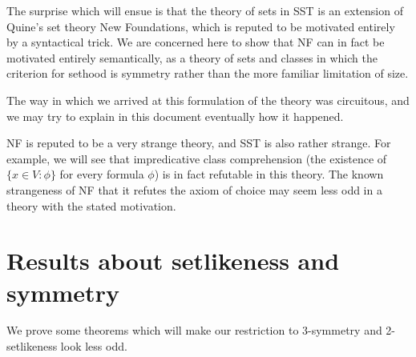 \documentclass[12pt]{article}
\begin{document}
The surprise which will ensue is that the theory of sets in SST is an extension of Quine's set theory New Foundations, which is reputed to be motivated entirely by a syntactical trick.  We are concerned here to show that NF can in fact be motivated entirely semantically, as a theory of sets and classes in which the criterion for sethood is symmetry rather than the more familiar limitation of size.

The way in which we arrived at this formulation of the theory was circuitous, and we may try to explain in this document eventually how it happened.

NF is reputed to be a very strange theory, and SST is also rather strange.  For example, we will see that impredicative class comprehension
(the existence of $\{x\in V:\phi\}$ for every formula $\phi$) is in fact refutable in this theory.  The known strangeness of NF that it refutes the axiom of choice may seem less odd in a theory with the stated motivation.

\section{Results about setlikeness and symmetry}

We prove some theorems which will make our restriction to 3-symmetry and 2-setlikeness look less odd.
\end{document}
